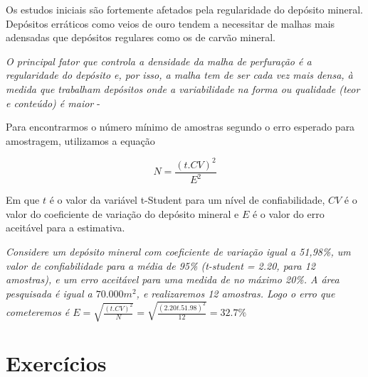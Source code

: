 Os  estudos iniciais são fortemente afetados pela regularidade do depósito mineral. Depósitos erráticos como veios de ouro tendem a necessitar de malhas mais adensadas que depósitos regulares como os de carvão mineral.

\begin{remark}
	\textit{O principal fator que controla a densidade da malha de perfuração é a regularidade do depósito e, por isso, a malha tem de ser cada vez mais densa, à medida que trabalham depósitos onde a variabilidade na forma ou qualidade (teor e conteúdo) é maior} - \cite{maranhao1985introduccao} 
\end{remark}

Para encontrarmos o número mínimo de amostras segundo o erro esperado para amostragem, utilizamos a equação

\begin{equation}\label{area_influ}
N = \frac{(t.CV)^2}{E^{2}}
\end{equation}

Em que $t$ é o valor da variável t-Student para um nível de confiabilidade, $CV$ é o valor do coeficiente de variação do depósito mineral e $E$ é o valor do erro aceitável para a estimativa. 

\begin{proposition}
	\textit{Considere um depósito mineral com coeficiente de variação igual a 51,98\%, um valor de confiabilidade para a média de 95\% (t-student = 2.20, para 12 amostras), e um erro aceitável para uma medida de no máximo 20\%. A área pesquisada é igual a $70.000m^{2}$, e realizaremos 12 amostras. Logo o erro que cometeremos é $E=\sqrt{\frac{(t.CV)^{2}}{N}} = \sqrt{\frac{(2.20t.51.98)^{2}}{12}}= 32.7\%$}
\end{proposition}

\section{Exercícios}

